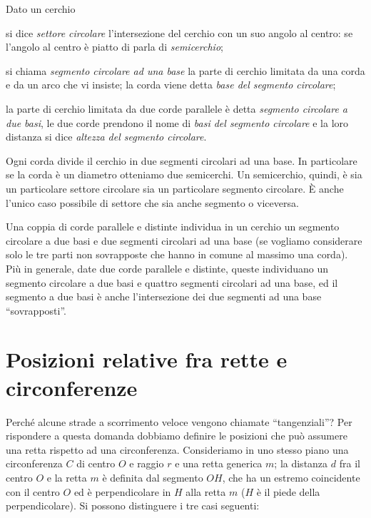 \begin{definizione}Dato un cerchio
\begin{itemize*}
\item si dice \emph{settore circolare} l'intersezione del cerchio con 
un suo angolo al centro: se l'angolo al centro è piatto di parla di 
\emph{semicerchio};
\item si chiama \emph{segmento circolare ad una base} la parte di 
cerchio limitata da una corda e da un arco che vi insiste; la corda 
viene detta \emph{base del segmento circolare};
\item la parte di cerchio limitata da due corde parallele è detta 
\emph{segmento circolare a due basi}, le due corde prendono il nome 
di \emph{basi del segmento circolare} e la loro distanza si dice 
\emph{altezza del segmento circolare}.
\end{itemize*}
\end{definizione}

Ogni corda divide il cerchio in due segmenti circolari ad una base. 
In particolare se la corda è un diametro otteniamo due semicerchi.
Un semicerchio, quindi, è sia un particolare settore circolare sia un 
particolare segmento circolare. \`E anche l'unico caso possibile di 
settore che sia anche segmento o viceversa.

\noindent\begin{minipage}{0.5\textwidth}\parindent15pt
Una coppia di corde parallele e distinte individua in un cerchio un segmento 
circolare a due basi e due segmenti circolari ad una base (se 
vogliamo considerare solo le tre parti non sovrapposte che hanno in 
comune al massimo una corda). Più in generale, date due corde 
parallele e distinte, queste individuano un segmento circolare a due 
basi e quattro segmenti circolari ad una base, ed il segmento a due 
basi è anche l'intersezione dei due segmenti ad una base 
``sovrapposti''.
\end{minipage}\hfil
\begin{minipage}{0.5\textwidth}
  \centering
\end{minipage}

\section{Posizioni relative fra rette e 
circonferenze}\label{sect:posizioni_rette_circonferenze}

Perché alcune strade a scorrimento veloce vengono chiamate 
``tangenziali''?
Per rispondere a questa domanda dobbiamo definire le posizioni che 
può assumere una retta rispetto ad una circonferenza.
Consideriamo in uno stesso piano una circonferenza \(C\) di centro \(O\) 
e raggio \(r\) e una retta generica \(m\); la distanza \(d\) fra il centro 
\(O\) e la retta \(m\) è definita dal segmento \(OH\), che ha un estremo 
coincidente con il centro \(O\) ed è perpendicolare in \(H\) alla retta 
\(m\) (\(H\) è il piede della perpendicolare). Si possono distinguere i 
tre casi seguenti:\vspace{4pt}

